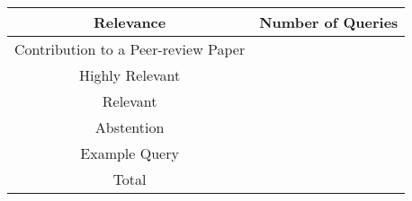\begin{center}
    \begin{tabular}{|c|c|}
        \hline
        Relevance & Number of Queries \\
        \hline\hline
        Contribution to a Peer-review Paper & {} \\
        \hline
        Highly Relevant                     & {} \\
        \hline
        Relevant                            & {} \\
        \hline
        Abstention                          & {} \\
        \hline
        Example Query                       & {} \\
        \hline\hline
        Total                               & {} \\
        \hline
    \end{tabular}
\end{center}
    